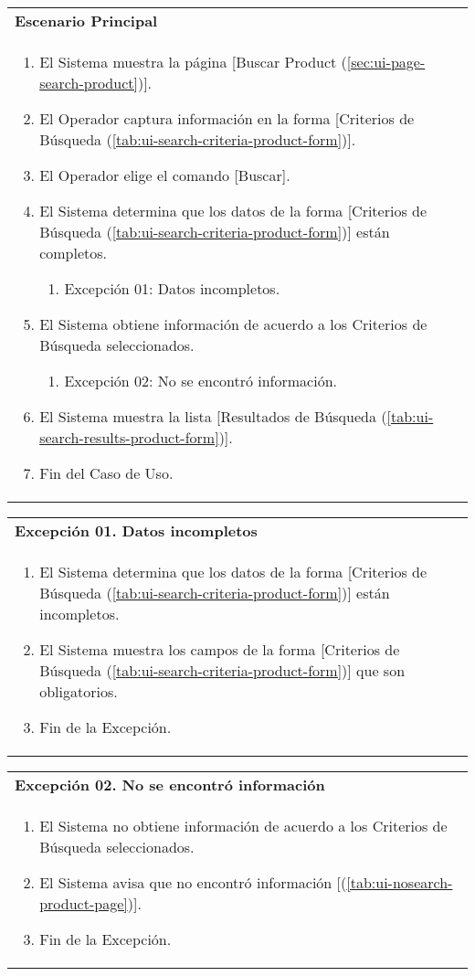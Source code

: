 	\begin{tabular}{ p{15.5cm} }
		\textbf{Escenario Principal} \\
		\begin{enumerate}
			\item El Sistema muestra la p\'agina [Buscar Product (\ref{sec:ui-page-search-product})].
			\item El Operador captura informaci\'on en la forma [Criterios de B\'usqueda (\ref{tab:ui-search-criteria-product-form})].
			\item El Operador elige el comando [Buscar].
			\item El Sistema determina que los datos de la forma [Criterios de B\'usqueda (\ref{tab:ui-search-criteria-product-form})] est\'an completos.
				\begin{enumerate}
					\item Excepci\'on 01: Datos incompletos.
				\end{enumerate}
			\item El Sistema obtiene informaci\'on de acuerdo a los Criterios de B\'usqueda seleccionados.
				\begin{enumerate}
					\item Excepci\'on 02: No se encontr\'o informaci\'on.
				\end{enumerate}
			\item El Sistema muestra la lista [Resultados de B\'usqueda (\ref{tab:ui-search-results-product-form})].
			\item Fin del Caso de Uso.
		\end{enumerate}
	\end{tabular}
	
	\begin{tabular}{ p{15.5cm} }
		\textbf{Excepci\'on 01. Datos incompletos} \\
		\begin{enumerate}
			\item El Sistema determina que los datos de la forma [Criterios de B\'usqueda (\ref{tab:ui-search-criteria-product-form})] est\'an incompletos.
			\item El Sistema muestra los campos de la forma [Criterios de B\'usqueda (\ref{tab:ui-search-criteria-product-form})] que son obligatorios.
			\item Fin de la Excepci\'on.
		\end{enumerate}
	\end{tabular}
	
	\begin{tabular}{ p{15.5cm} }
		\textbf{Excepci\'on 02. No se encontr\'o informaci\'on} \\
		\begin{enumerate}
			\item El Sistema no obtiene informaci\'on de acuerdo a los Criterios de B\'usqueda seleccionados.
			\item El Sistema avisa que no encontr\'o informaci\'on [(\ref{tab:ui-nosearch-product-page})].
			\item Fin de la Excepci\'on.
		\end{enumerate}
	\end{tabular}
	
